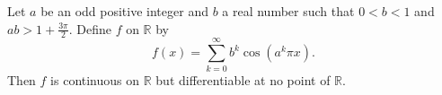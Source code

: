 Let $a$ be an odd positive integer and $b$ a real number such that $0 < b < 1$ and $ab > 1 + \frac{3\pi}{2}$. Define $f$ on $\mathbb{R}$ by
$$f(x) = \sum_{k=0}^{\infty} b^k \cos(a^k \pi x).$$
Then $f$ is continuous on $\mathbb{R}$ but differentiable at no point of $\mathbb{R}$.
